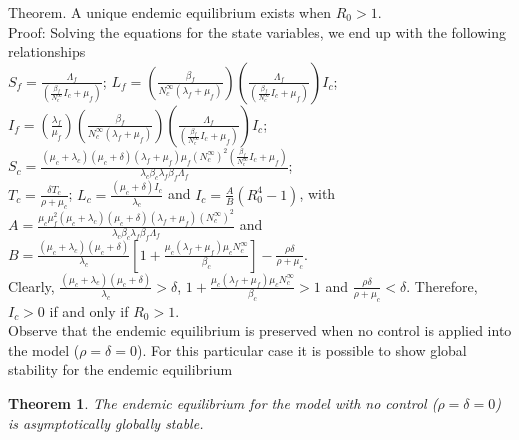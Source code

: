 \documentclass[preprint, 12pt]{elsarticle}
\newtheorem{theorem}{Theorem}
\begin{document}
\noindent Theorem. A unique endemic equilibrium exists when $R_0>1$.\\
Proof: Solving the equations for the state variables, we end up with the following relationships\\
$S_f=\frac{\Lambda_f}{\left(\frac{\beta_f}{N_c^{\infty}}I_c+\mu_f\right)}$;
$L_f=\left(\frac{\beta_f}{N_c^{\infty}(\lambda_f+\mu_f)}\right)\left(\frac{\Lambda_f}{\left(\frac{\beta_f}{N_c^{\infty}}I_c+\mu_f\right)}\right)I_c$;\\
$I_f=\left(\frac{\lambda_f}{\mu_f}\right)\left(\frac{\beta_f}{N_c^{\infty}(\lambda_f+\mu_f)}\right)\left(\frac{\Lambda_f}{\left(\frac{\beta_f}{N_c^{\infty}}I_c+\mu_f\right)}\right)I_c$;
$S_c=\frac{(\mu_c+\lambda_c)(\mu_c+\delta)(\lambda_f+\mu_f)
    \mu_f
    (N_c^{\infty})^2\left(\frac{\beta_f}{N_c^{\infty}}I_c+\mu_f\right)}{\lambda_c\beta_c\lambda_f\beta_f\Lambda_f}$;\\
$T_c=\frac{\delta T_c}{\rho+\mu_c}$;
$L_c=\frac{(\mu_c+\delta)I_c}{\lambda_c}$ and
$I_c=\frac{A}{B}\left(R_0^4-1\right)$,
with\\
$A=\frac{\mu_c\mu_f^2(\mu_c+\lambda_c)(\mu_c+\delta)(\lambda_f+\mu_f)
    (N_c^{\infty})^2}{\lambda_c\beta_c\lambda_f\beta_f\Lambda_f}$ and
    $B=\frac{(\mu_c+\lambda_c)(\mu_c+\delta)}{\lambda_c}\left[1+{\frac{\mu_c(\lambda_f+\mu_f)\mu_cN_c^{\infty}}{\beta_c}}\right]-\frac{\rho\delta}{\rho+\mu_c}$.\\
Clearly, $\frac{(\mu_c+\lambda_c)(\mu_c+\delta)}{\lambda_c}>\delta$, $1+{\frac{\mu_c(\lambda_f+\mu_f)\mu_c N_c^{\infty}}{\beta_c}}>1$ and $\frac{\rho\delta}{\rho+\mu_c}<\delta$. Therefore, $I_c>0$ if and only if $R_0>1$.\\

\noindent Observe that the endemic equilibrium is preserved when no control is applied into the model ($\rho=\delta=0$). For this particular case it is possible to show global stability for the endemic equilibrium\\

\begin{theorem}
        The endemic equilibrium for the model with no control ($\rho=\delta=0$)
    is asymptotically globally stable.
\end{theorem}
\end{document}
